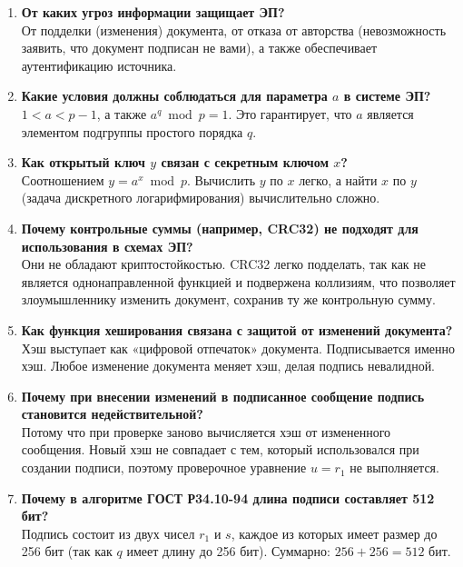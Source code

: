 \documentclass[12pt]{article}
\begin{document}
\begin{enumerate}
    \item \textbf{От каких угроз информации защищает ЭП?} \\
    От подделки (изменения) документа, от отказа от авторства (невозможность заявить, что документ подписан не вами), а также обеспечивает аутентификацию источника.

    \item \textbf{Какие условия должны соблюдаться для параметра \(a\) в системе ЭП?} \\
    \(1 < a < p-1\), а также \(a^q \bmod p = 1\). Это гарантирует, что \(a\) является элементом подгруппы простого порядка \(q\).

    \item \textbf{Как открытый ключ \(y\) связан с секретным ключом \(x\)?} \\
    Соотношением \(y = a^x \bmod p\). Вычислить \(y\) по \(x\) легко, а найти \(x\) по \(y\) (задача дискретного логарифмирования) вычислительно сложно.

    \item \textbf{Почему контрольные суммы (например, CRC32) не подходят для использования в схемах ЭП?} \\
    Они не обладают криптостойкостью. CRC32 легко подделать, так как не является однонаправленной функцией и подвержена коллизиям, что позволяет злоумышленнику изменить документ, сохранив ту же контрольную сумму.

    \item \textbf{Как функция хеширования связана с защитой от изменений документа?} \\
    Хэш выступает как «цифровой отпечаток» документа. Подписывается именно хэш. Любое изменение документа меняет хэш, делая подпись невалидной.

    \item \textbf{Почему при внесении изменений в подписанное сообщение подпись становится недействительной?} \\
    Потому что при проверке заново вычисляется хэш от измененного сообщения. Новый хэш не совпадает с тем, который использовался при создании подписи, поэтому проверочное уравнение \(u = r_1\) не выполняется.

    \item \textbf{Почему в алгоритме ГОСТ Р34.10-94 длина подписи составляет 512 бит?} \\
    Подпись состоит из двух чисел \(r_1\) и \(s\), каждое из которых имеет размер до 256 бит (так как \(q\) имеет длину до 256 бит). Суммарно: \(256 + 256 = 512\) бит.


\end{enumerate}
\end{document}
